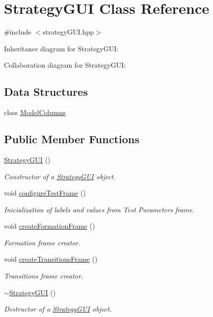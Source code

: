 \hypertarget{class_strategy_g_u_i}{}\section{Strategy\+G\+UI Class Reference}
\label{class_strategy_g_u_i}


{\ttfamily \#include $<$strategy\+G\+U\+I.\+hpp$>$}



Inheritance diagram for Strategy\+G\+UI\+:


Collaboration diagram for Strategy\+G\+UI\+:
\subsection*{Data Structures}
\begin{DoxyCompactItemize}
\item 
class \hyperlink{class_strategy_g_u_i_1_1_model_columns}{Model\+Columns}
\end{DoxyCompactItemize}
\subsection*{Public Member Functions}
\begin{DoxyCompactItemize}
\item 
\hyperlink{class_strategy_g_u_i_a6676ae87f9ccabe157ec8e60f94041b7}{Strategy\+G\+UI} ()
\begin{DoxyCompactList}\small\item\em Constructor of a \hyperlink{class_strategy_g_u_i}{Strategy\+G\+UI} object. \end{DoxyCompactList}\item 
void \hyperlink{class_strategy_g_u_i_aaeb2b9affadab5eafc8885f983a1cc36}{configure\+Test\+Frame} ()
\begin{DoxyCompactList}\small\item\em Inicialization of labels and values from Test Parameters frame. \end{DoxyCompactList}\item 
void \hyperlink{class_strategy_g_u_i_a38540d2d52e6bd3955e85adce92dac41}{create\+Formation\+Frame} ()
\begin{DoxyCompactList}\small\item\em Formation frame creator. \end{DoxyCompactList}\item 
void \hyperlink{class_strategy_g_u_i_ab39aceb2dc4fc8b0b571d9284c463b5a}{create\+Transitions\+Frame} ()
\begin{DoxyCompactList}\small\item\em Transitions frame creator. \end{DoxyCompactList}\item 
\hyperlink{class_strategy_g_u_i_a3957136621bf4eeeb13df4340b2fcb93}{$\sim$\+Strategy\+G\+UI} ()
\begin{DoxyCompactList}\small\item\em Destructor of a \hyperlink{class_strategy_g_u_i}{Strategy\+G\+UI} object. \end{DoxyCompactList}\end{DoxyCompactItemize}
